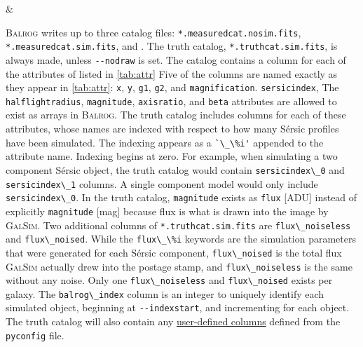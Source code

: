 \documentclass[11pt]{book}
\newcommand{\codett}[1]{\lstinline{#1}}
\newcommand{\galsim}{\textsc{GalSim}}
\newcommand{\balrog}{\textsc{Balrog}}
\newcommand{\opt}[1]{\codett{--#1}}
\newcommand{\sersic}{S\'{e}rsic}
\begin{document}
\begin{table}
\begin{longtabu}
 & \\
\bottomrule %
\end{longtabu}
\end{table}

\balrog{} writes up to three catalog files:
\codett{*.measuredcat.nosim.fits}, \codett{*.measuredcat.sim.fits}, and .
The truth catalog, \codett{*.truthcat.sim.fits}, is always made, unless \codett{--nodraw} is set.
The catalog contains a column for each of the attributes of listed in \autoref{tab:attr}
Five of the columns are named exactly as they appear in \autoref{tab:attr}: 
\codett{x}, \codett{y}, \codett{g1}, \codett{g2}, and \codett{magnification}.
\codett{sersicindex}, 
The \codett{halflightradius}, \codett{magnitude}, \codett{axisratio}, and \codett{beta}
attributes are allowed to exist as arrays in \balrog{}. 
The truth catalog includes columns for each of these attributes, whose names
are indexed with respect to how many \sersic{} profiles have been simulated.
The indexing appears as a \codett{`\_\%i'} appended to the attribute name.
Indexing begins at zero.
For example, when simulating a two component \sersic{} object, the truth catalog
would contain \codett{sersicindex\_0} and \codett{sersicindex\_1} columns.
A single component model would only include \codett{sersicindex\_0}.
In the truth catalog, \codett{magnitude} exists as \codett{flux} [ADU] instead
of explicitly \codett{magnitude} [mag] because flux is what is drawn into the image by \galsim{}.
Two additional columns of \codett{*.truthcat.sim.fits} are \codett{flux\_noiseless} and \codett{flux\_noised}.
While the \codett{flux\_\%i} keywords are the simulation parameters that were generated for each \sersic{} component,
\codett{flux\_noised} is the total flux \galsim{} actually drew into the postage stamp,
and \codett{flux\_noiseless} is the same without any noise.
Only one \codett{flux\_noiseless} and \codett{flux\_noised} exists per galaxy.
The \codett{balrog\_index} column is an integer to uniquely identify each simulated object, beginning at \opt{indexstart},
and incrementing for each object.
The truth catalog will also contain any \hyperlink{hyper:addtruth}{user-defined columns} defined from the \codett{pyconfig} file.
\end{document}
